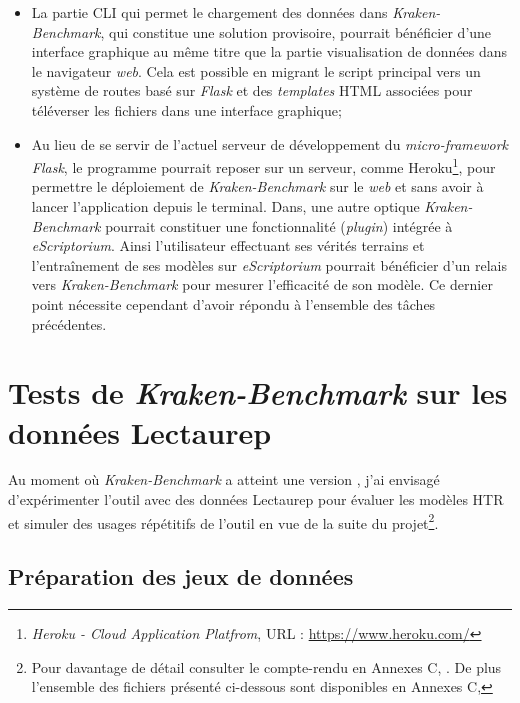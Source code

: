 \begin{itemize}
    \item La partie CLI qui permet le chargement des données dans \textit{Kraken-Benchmark}, qui constitue une solution provisoire, pourrait bénéficier d'une interface graphique au même titre que la partie visualisation de données dans le navigateur \textit{web}. Cela est possible en migrant le script principal  vers un système de routes basé sur \textit{Flask} et des \textit{templates} HTML associées pour téléverser les fichiers dans une interface graphique;
    \item Au lieu de se servir de l'actuel serveur de développement du \textit{micro-framework Flask}, le programme pourrait reposer sur un serveur, comme Heroku\footnote{\textit{Heroku - Cloud Application Platfrom}, URL : \url{https://www.heroku.com/}}, pour permettre le déploiement de \textit{Kraken-Benchmark} sur le \textit{web} et sans avoir à lancer l'application depuis le terminal. Dans, une autre optique \textit{Kraken-Benchmark} pourrait constituer une fonctionnalité (\textit{plugin}) intégrée à \textit{eScriptorium}. Ainsi l'utilisateur effectuant ses vérités terrains et l'entraînement de ses modèles sur \textit{eScriptorium} pourrait bénéficier d'un relais vers \textit{Kraken-Benchmark} pour mesurer l'efficacité de son modèle. Ce dernier point nécessite cependant d'avoir répondu à l'ensemble des tâches précédentes.
\end{itemize}

\chapter{Tests de \textit{Kraken-Benchmark} sur les données Lectaurep}\label{tests_KB_lectaurep}

Au moment où \textit{Kraken-Benchmark} a atteint une version , j'ai envisagé d'expérimenter l'outil avec des données Lectaurep pour évaluer les modèles HTR et simuler des usages répétitifs de l'outil en vue de la suite du projet\footnote{Pour davantage de détail consulter le compte-rendu en Annexes C, . De plus l'ensemble des fichiers présenté ci-dessous sont disponibles en Annexes C, }.

\section{Préparation des jeux de données} 

